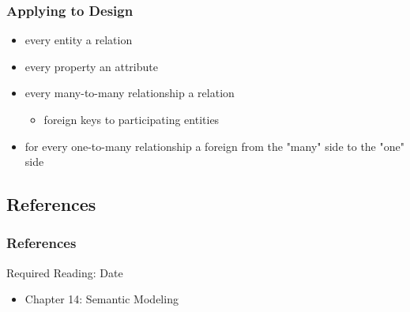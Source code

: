 \documentclass[dvipsnames]{beamer}
\begin{document}
\begin{frame}
  \frametitle{Applying to Design}

  \begin{itemize}
    \item every entity a relation

    \pause
    \item every property an attribute

    \pause
    \item every many-to-many relationship a relation
    \begin{itemize}
      \item foreign keys to participating entities
    \end{itemize}

    \pause
    \item for every one-to-many relationship a foreign from the
      "many" side to the "one" side
 \end{itemize}
\end{frame}

\subsection*{References}

\begin{frame}
  \frametitle{References}

  \begin{block}{Required Reading: Date}
    \begin{itemize}
      \item Chapter 14: \alert{Semantic Modeling}
    \end{itemize}
  \end{block}
\end{frame}
\end{document}
